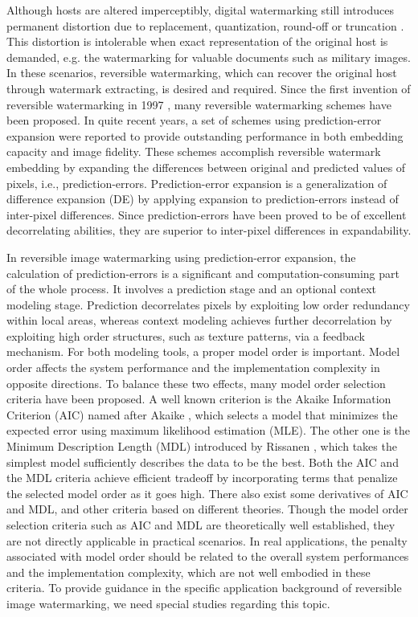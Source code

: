 \documentclass[journal]{IEEEtran}
\begin{document}
Although hosts are altered imperceptibly, digital watermarking still introduces permanent distortion
due to replacement, quantization, round-off or truncation \cite{Fridrich02lossless}. This distortion
is intolerable when exact representation of the original host is demanded, e.g. the watermarking for
valuable documents such as military images. In these scenarios, reversible watermarking, which can
recover the original host through watermark extracting, is desired and required. Since the first
invention of reversible watermarking in 1997 \cite{Barton97Patent}, many reversible watermarking
schemes have been proposed. In quite recent years, a set of schemes using prediction-error
expansion \cite{Thodi07,Kuribayashi08,Chang08pe,Chen09add,Chen09full,Tsai09pe,Weng09pe,Hu2009} were
reported to provide outstanding performance in both embedding capacity and image fidelity. These
schemes accomplish reversible watermark embedding by expanding the differences between original and
predicted values of pixels, i.e., prediction-errors. Prediction-error expansion is a generalization
of difference expansion (DE) \cite{Tian03de} by applying expansion to prediction-errors instead of
inter-pixel differences. Since prediction-errors have been proved to be of excellent decorrelating
abilities, they are superior to inter-pixel differences in expandability.

In reversible image watermarking using prediction-error expansion, the calculation of
prediction-errors is a significant and computation-consuming part of the whole process. It involves
a prediction stage and an optional context modeling stage. Prediction decorrelates pixels by
exploiting low order redundancy within local areas, whereas context modeling achieves further
decorrelation by exploiting high order structures, such as texture patterns, via a feedback
mechanism. For both modeling tools, a proper model order is important. Model order affects the
system performance and the implementation complexity in opposite directions. To balance these two
effects, many model order selection criteria have been proposed. A well known criterion is the
Akaike Information Criterion (AIC) named after Akaike \cite{Akaike1974}, which selects a model that
minimizes the expected error using maximum likelihood estimation (MLE). The other one is the Minimum
Description Length (MDL) introduced by Rissanen \cite{Rissanen1984}, which takes the simplest model
sufficiently describes the data to be the best. Both the AIC and the MDL criteria achieve efficient
tradeoff by incorporating terms that penalize the selected model order as it goes high. There also
exist some derivatives of AIC and MDL, and other criteria based on different theories. Though the
model order selection criteria such as AIC and MDL are theoretically well established, they are not
directly applicable in practical scenarios. In real applications, the penalty associated with model
order should be related to the overall system performances and the implementation complexity, which
are not well embodied in these criteria. To provide guidance in the specific application background
of reversible image watermarking, we need special studies regarding this topic.
\end{document}
